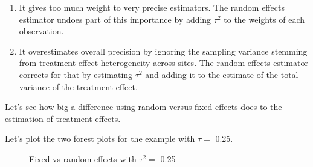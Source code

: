 \documentclass[]{book}
\newenvironment{Shaded}{\begin{snugshade}}{\end{snugshade}}
\newcommand{\DataTypeTok}[1]{\textcolor[rgb]{0.13,0.29,0.53}{#1}}
\newcommand{\FloatTok}[1]{\textcolor[rgb]{0.00,0.00,0.81}{#1}}
\newcommand{\KeywordTok}[1]{\textcolor[rgb]{0.13,0.29,0.53}{\textbf{#1}}}
\newcommand{\NormalTok}[1]{#1}
\newcommand{\OperatorTok}[1]{\textcolor[rgb]{0.81,0.36,0.00}{\textbf{#1}}}
\newcommand{\StringTok}[1]{\textcolor[rgb]{0.31,0.60,0.02}{#1}}
\providecommand{\tightlist}{%
  \setlength{\itemsep}{0pt}\setlength{\parskip}{0pt}}
\theoremstyle{definition}
\theoremstyle{definition}
\theoremstyle{definition}
\theoremstyle{remark}
\let\BeginKnitrBlock\begin \let\EndKnitrBlock\end
\begin{document}
\begin{enumerate}
\def\labelenumi{\arabic{enumi}.}
\tightlist
\item
  It gives too much weight to very precise estimators.
  The random effects estimator undoes part of this importance by adding \(\tau^2\) to the weights of each observation.
\item
  It overestimates overall precision by ignoring the sampling variance stemming from treatment effect heterogeneity across sites.
  The random effects estimator corrects for that by estimating \(\tau^2\) and adding it to the estimate of the total variance of the treatment effect.
\end{enumerate}

\BeginKnitrBlock{example}
\protect\hypertarget{exm:unnamed-chunk-159}{}{\label{exm:unnamed-chunk-159} }Let's see how big a difference using random versus fixed effects does to the estimation of treatment effects.
\EndKnitrBlock{example}

Let's plot the two forest plots for the example with \(\tau=\) 0.25.

\begin{Shaded}
\end{Shaded}

\begin{figure}[htbp]

{\centering {}

}

\caption{Fixed vs random effects with $\tau^2=$ 0.25}\label{fig:FEvsRE}
\end{figure}
\end{document}
